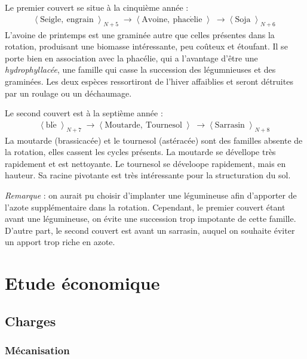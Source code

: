 \documentclass{article}
\begin{document}
Le premier couvert se situe à la cinquième année :
\begin{align*}
\left\langle \right. \mathrm{Seigle,\ engrain}  \left\rangle \right._{N+5}  \longrightarrow \left\langle \right.\mathrm{Avoine,\ phac\acute{e}lie}\left\rangle \right.\longrightarrow \left\langle \right. \mathrm{Soja} \left\rangle \right._{N+6}
\end{align*}
L'avoine de printemps est une graminée autre que celles présentes dans la rotation, produisant une biomasse intéressante, peu coûteux et étoufant. Il se porte bien en association avec la phacélie, qui a l'avantage d'être une \textit{hydrophyllacée}, une famille qui casse la succession des légumnieuses et des graminées. Les deux espèces ressortiront de l'hiver affaiblies et seront détruites par un roulage ou un déchaumage.

Le second couvert est à la septième année :
\begin{align*}
\left\langle \right. \mathrm{bl\acute{e}}  \left\rangle \right._{N+7}  \longrightarrow \left\langle \right.\mathrm{Moutarde,\ Tournesol}\left\rangle \right.\longrightarrow \left\langle \right. \mathrm{Sarrasin} \left\rangle \right. _{N+8}
\end{align*}
La moutarde (brassicacée) et le tournesol (astéracée) sont des familles absente de la rotation, elles cassent les cycles présents. La moutarde se dévellope très rapidement et est nettoyante. Le tournesol se déveloope rapidement, mais en hauteur. Sa racine pivotante est très intéressante pour la structuration du sol.

\textit{Remarque} : on aurait pu choisir d'implanter une légumineuse afin d'apporter de l'azote supplémentaire dans la rotation. Cependant, le premier couvert étant avant une légumineuse, on évite une succession trop impotante de cette famille. D'autre part, le second couvert est avant un sarrasin, auquel on souhaite éviter un apport trop riche en azote.

\section{Etude économique}

\subsection{Charges}

\subsubsection{Mécanisation}
\end{document}
